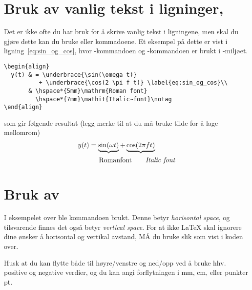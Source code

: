 \section{Bruk av vanlig tekst i ligninger, }
Det er ikke ofte du har bruk for å skrive vanlig tekst i ligningene,
men skal du gjøre dette kan du bruke 
 eller 
 kommadoene. 
Et eksempel på dette er vist i ligning~\eqref{eq:sin_og_cos}, hvor 
-kommandoen og 
-kommandoen  er brukt i -miljøet. 

\begin{boxedminipage}{160mm}
\begin{verbatim}
\begin{align}
  y(t) & = \underbrace{\sin(\omega t)} 
          + \underbrace{\cos(2 \pi f t)} \label{eq:sin_og_cos}\\
       & \hspace*{5mm}\mathrm{Roman font} 
         \hspace*{7mm}\mathit{Italic~font}\notag
\end{align}
\end{verbatim}
\end{boxedminipage}

som gir følgende resultat (legg merke til at du må bruke tilde for å
lage mellomrom)
\begin{align}
  y(t)  &= \underbrace{\sin(\omega t)} 
          + \underbrace{\cos(2 \pi f t)}   \label{eq:sin_og_cos} \\
          & \hspace*{5mm}\mathrm{Roman font}
            \hspace*{7mm}\mathit{Italic~font} \notag
\end{align}

\section{Bruk av }\label{delkap:hspace}
I eksempelet over ble kommandoen 
brukt.  Denne betyr {\em horisontal space}, og
tilsvarende finnes det også  betyr 
{\em vertical  space}. For at ikke {\LaTeX} skal ignorere dine ønsker
å horisontal og vertikal avstand, MÅ du bruke {\tt *} slik som vist i
koden over. 

Husk at du kan flytte både til høyre/venstre og ned/opp ved å
bruke hhv. positive og negative verdier, og du kan angi forflytningen
i mm, cm, eller punkter pt.

